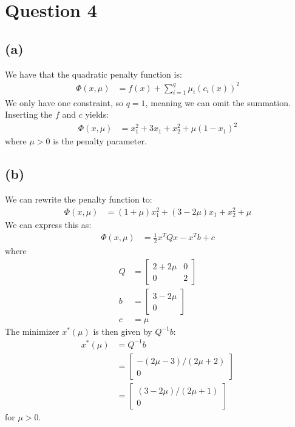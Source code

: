 \documentclass[a4paper, fleqn]{article}
\begin{document}
\section*{Question 4}
\subsection*{(a)}
We have that the quadratic penalty function is:
\begin{align*}
  \Phi(x,\mu) &= f(x) + \sum_{i=1}^q\mu_i\left( c_i(x)\right)^2
\end{align*}
We only have one constraint, so $q=1$, meaning we can omit the summation. Inserting the $f$ and $c$
yields:
\begin{align*}
  \Phi(x,\mu) &= x_1^2+3x_1+x_2^2 +\mu \left(1-x_1\right)^2
\end{align*}
where $\mu>0$ is the penalty parameter.

\subsection*{(b)}
We can rewrite the penalty function to:
\begin{align*}
  \Phi(x,\mu) &=
  \left(1+\mu\right)x_1^2+\left(3-2\mu\right)x_1+x_2^2+\mu
\end{align*}
We can express this as:
\begin{align*}
  \Phi(x,\mu) &= \frac{1}{2}x^TQx-x^Tb+c
\end{align*}
where
\begin{align*}
  Q &= \begin{bmatrix}
          2+2\mu & 0 \\
          0 & 2
       \end{bmatrix} \\
       b &= \begin{bmatrix}
       3-2\mu \\
       0
     \end{bmatrix} \\
     c &= \mu
\end{align*}
The minimizer $x^*(\mu)$ is then given by $Q^{-1}b$:
\begin{align*}
  x^*(\mu) &= Q^{-1}b \\
           &=\begin{bmatrix} -(2\mu-3)/(2\mu+2) \\ 0 \end{bmatrix} \\
           &=\begin{bmatrix} (3-2\mu)/(2\mu+1) \\ 0 \end{bmatrix}
\end{align*}
for $\mu>0$.
\end{document}
